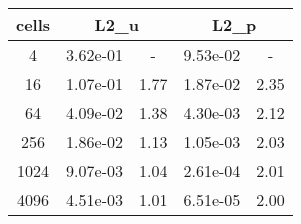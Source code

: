 \documentclass[10pt]{report}
\begin{document}
\begin{table}[H]
\begin{center}
\begin{tabular}{|c|c|c|c|c|} \hline
cells & 
\multicolumn{2}{|c|}{L2_u} & 
\multicolumn{2}{|c|}{L2_p}\\ \hline
4 & 3.62e-01 & - & 9.53e-02 & -\\ \hline
16 & 1.07e-01 & 1.77 & 1.87e-02 & 2.35\\ \hline
64 & 4.09e-02 & 1.38 & 4.30e-03 & 2.12\\ \hline
256 & 1.86e-02 & 1.13 & 1.05e-03 & 2.03\\ \hline
1024 & 9.07e-03 & 1.04 & 2.61e-04 & 2.01\\ \hline
4096 & 4.51e-03 & 1.01 & 6.51e-05 & 2.00\\ \hline
\end{tabular}
\end{center}
\end{table}
\end{document}
